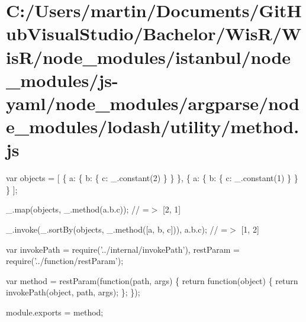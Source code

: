 \hypertarget{_c_1_2_users_2martin_2_documents_2_git_hub_visual_studio_2_bachelor_2_wis_r_2_wis_r_2node_modulec85d2efa78eea3455cd71aac12a12982}{}\section{C\+:/\+Users/martin/\+Documents/\+Git\+Hub\+Visual\+Studio/\+Bachelor/\+Wis\+R/\+Wis\+R/node\+\_\+modules/istanbul/node\+\_\+modules/js-\/yaml/node\+\_\+modules/argparse/node\+\_\+modules/lodash/utility/method.\+js}
var objects = \mbox{[} \{ \textquotesingle{}a\textquotesingle{}\+: \{ \textquotesingle{}b\textquotesingle{}\+: \{ \textquotesingle{}c\textquotesingle{}\+: \+\_\+.\+constant(2) \} \} \}, \{ \textquotesingle{}a\textquotesingle{}\+: \{ \textquotesingle{}b\textquotesingle{}\+: \{ \textquotesingle{}c\textquotesingle{}\+: \+\_\+.\+constant(1) \} \} \} \mbox{]};

\+\_\+.\+map(objects, \+\_\+.\+method(\textquotesingle{}a.\+b.\+c\textquotesingle{})); // =$>$ \mbox{[}2, 1\mbox{]}

\+\_\+.\+invoke(\+\_\+.\+sort\+By(objects, \+\_\+.\+method(\mbox{[}\textquotesingle{}a\textquotesingle{}, \textquotesingle{}b\textquotesingle{}, \textquotesingle{}c\textquotesingle{}\mbox{]})), \textquotesingle{}a.\+b.\+c\textquotesingle{}); // =$>$ \mbox{[}1, 2\mbox{]}


\begin{DoxyCodeInclude}
var invokePath = require(\textcolor{stringliteral}{'../internal/invokePath'}),
    restParam = require(\textcolor{stringliteral}{'../function/restParam'});

var method = restParam(\textcolor{keyword}{function}(path, args) \{
  \textcolor{keywordflow}{return} \textcolor{keyword}{function}(object) \{
    \textcolor{keywordflow}{return} invokePath(\textcolor{keywordtype}{object}, path, args);
  \};
\});

module.exports = method;
\end{DoxyCodeInclude}
 